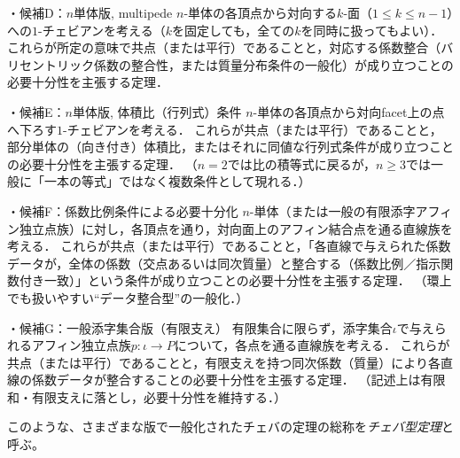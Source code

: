 \documentclass[a4paper,12pt]{bxjsbook}
\newlength{\customindent}
\newenvironment{body}{
  \par
  \begingroup
  \setlength{\leftskip}{\customindent}
  \setlength{\rightskip}{0pt}
  \setlength{\parindent}{1em}
  \setlength{\displayindent}{\customindent}
  \setlength{\displaywidth}{\dimexpr\linewidth-\customindent\relax}
}{
  \par
  \endgroup
}
\theoremstyle{theorem}
\begin{document}
\begin{body}
\begin{bodydescription}
            \item[\hspace*{1.5em}・候補D：$n$単体版, multipede]
            $n$-単体の各頂点から対向する$k$-面（$1 \leq k \leq n-1$）への$1$-チェビアンを考える（$k$を固定しても，全ての$k$を同時に扱ってもよい）．
            これらが所定の意味で共点（または平行）であることと，対応する係数整合（バリセントリック係数の整合性，または質量分布条件の一般化）が成り立つことの必要十分性を主張する定理．
            
            \item[\hspace*{1.5em}・候補E：$n$単体版, 体積比（行列式）条件]
            $n$-単体の各頂点から対向facet上の点へ下ろす$1$-チェビアンを考える．
            これらが共点（または平行）であることと，部分単体の（向き付き）体積比，またはそれに同値な行列式条件が成り立つことの必要十分性を主張する定理．
            （$n=2$では比の積等式に戻るが，$n\ge3$では一般に「一本の等式」ではなく複数条件として現れる．）
            
            \item[\hspace*{1.5em}・候補F：係数比例条件による必要十分化]
            $n$-単体（または一般の有限添字アフィン独立点族）に対し，各頂点を通り，対向面上のアフィン結合点を通る直線族を考える．
            これらが共点（または平行）であることと，「各直線で与えられた係数データが，全体の係数（交点あるいは同次質量）と整合する（係数比例／指示関数付き一致）」という条件が成り立つことの必要十分性を主張する定理．
            （環上でも扱いやすい“データ整合型”の一般化．）
            
            \item[\hspace*{1.5em}・候補G：一般添字集合版（有限支え）]
            有限集合に限らず，添字集合$\iota$で与えられるアフィン独立点族$p:\iota\to P$について，各点を通る直線族を考える．
            これらが共点（または平行）であることと，有限支えを持つ同次係数（質量）により各直線の係数データが整合することの必要十分性を主張する定理．
            （記述上は有限和・有限支えに落とし，必要十分性を維持する．）
                
        \end{bodydescription}

        \indent このような、さまざまな版で一般化されたチェバの定理の総称を\emph{チェバ型定理}と呼ぶ。
    \end{body}
\end{document}

